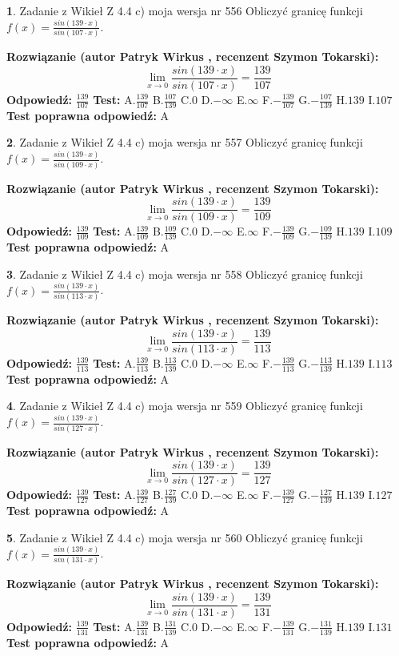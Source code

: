 \documentclass[12pt, a4paper]{article}
\theoremstyle{definition} %
\newtheorem{zad}{}
\newcommand{\zadStart}[1]{\begin{zad}#1\newline}
\newcommand{\zadStop}{\end{zad}}
\newcommand{\rozwStart}[2]{\noindent \textbf{Rozwiązanie (autor #1 , recenzent #2): }\newline}
\newcommand{\rozwStop}{\newline}
\newcommand{\odpStart}{\noindent \textbf{Odpowiedź:}\newline}
\newcommand{\odpStop}{\newline}
\newcommand{\testStart}{\noindent \textbf{Test:}\newline}
\newcommand{\testStop}{\newline}
\newcommand{\kluczStart}{\noindent \textbf{Test poprawna odpowiedź:}\newline}
\newcommand{\kluczStop}{\newline}
\begin{document}
\zadStart{Zadanie z Wikieł Z 4.4 c) moja wersja nr 556}
Obliczyć granicę funkcji $f(x)=\frac{sin(139\cdot x)}{sin(107\cdot x)}$.
\zadStop
\rozwStart{Patryk Wirkus}{Szymon Tokarski}
$$\lim\limits_{x\to 0}\frac{sin(139\cdot x)}{sin(107\cdot x)}=
\frac{139}{107}$$
\rozwStop
\odpStart
$\frac{139}{107}$
\odpStop
\testStart
A.$\frac{139}{107}$
B.$\frac{107}{139}$
C.$0$
D.$-\infty$
E.$\infty$
F.$-\frac{139}{107}$
G.$-\frac{107}{139}$
H.$139$
I.$107$
\testStop
\kluczStart
A
\kluczStop



\zadStart{Zadanie z Wikieł Z 4.4 c) moja wersja nr 557}
Obliczyć granicę funkcji $f(x)=\frac{sin(139\cdot x)}{sin(109\cdot x)}$.
\zadStop
\rozwStart{Patryk Wirkus}{Szymon Tokarski}
$$\lim\limits_{x\to 0}\frac{sin(139\cdot x)}{sin(109\cdot x)}=
\frac{139}{109}$$
\rozwStop
\odpStart
$\frac{139}{109}$
\odpStop
\testStart
A.$\frac{139}{109}$
B.$\frac{109}{139}$
C.$0$
D.$-\infty$
E.$\infty$
F.$-\frac{139}{109}$
G.$-\frac{109}{139}$
H.$139$
I.$109$
\testStop
\kluczStart
A
\kluczStop



\zadStart{Zadanie z Wikieł Z 4.4 c) moja wersja nr 558}
Obliczyć granicę funkcji $f(x)=\frac{sin(139\cdot x)}{sin(113\cdot x)}$.
\zadStop
\rozwStart{Patryk Wirkus}{Szymon Tokarski}
$$\lim\limits_{x\to 0}\frac{sin(139\cdot x)}{sin(113\cdot x)}=
\frac{139}{113}$$
\rozwStop
\odpStart
$\frac{139}{113}$
\odpStop
\testStart
A.$\frac{139}{113}$
B.$\frac{113}{139}$
C.$0$
D.$-\infty$
E.$\infty$
F.$-\frac{139}{113}$
G.$-\frac{113}{139}$
H.$139$
I.$113$
\testStop
\kluczStart
A
\kluczStop



\zadStart{Zadanie z Wikieł Z 4.4 c) moja wersja nr 559}
Obliczyć granicę funkcji $f(x)=\frac{sin(139\cdot x)}{sin(127\cdot x)}$.
\zadStop
\rozwStart{Patryk Wirkus}{Szymon Tokarski}
$$\lim\limits_{x\to 0}\frac{sin(139\cdot x)}{sin(127\cdot x)}=
\frac{139}{127}$$
\rozwStop
\odpStart
$\frac{139}{127}$
\odpStop
\testStart
A.$\frac{139}{127}$
B.$\frac{127}{139}$
C.$0$
D.$-\infty$
E.$\infty$
F.$-\frac{139}{127}$
G.$-\frac{127}{139}$
H.$139$
I.$127$
\testStop
\kluczStart
A
\kluczStop



\zadStart{Zadanie z Wikieł Z 4.4 c) moja wersja nr 560}
Obliczyć granicę funkcji $f(x)=\frac{sin(139\cdot x)}{sin(131\cdot x)}$.
\zadStop
\rozwStart{Patryk Wirkus}{Szymon Tokarski}
$$\lim\limits_{x\to 0}\frac{sin(139\cdot x)}{sin(131\cdot x)}=
\frac{139}{131}$$
\rozwStop
\odpStart
$\frac{139}{131}$
\odpStop
\testStart
A.$\frac{139}{131}$
B.$\frac{131}{139}$
C.$0$
D.$-\infty$
E.$\infty$
F.$-\frac{139}{131}$
G.$-\frac{131}{139}$
H.$139$
I.$131$
\testStop
\kluczStart
A
\kluczStop
\end{document}
